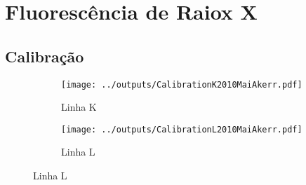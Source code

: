 \section{Fluorescência de Raiox X}

\subsection{Calibração}

\begin{table}[H]
 
  \begin{scriptsize} %
  \caption{}
  
  \end{scriptsize}
\end{table}

\begin{table}[H]
  
  \begin{scriptsize} %
  \caption{}
  
  \end{scriptsize}
\end{table}


\begin{table}[H]
  
  \begin{footnotesize} %
  \caption{}
  
  \end{footnotesize}
\end{table}

\begin{table}[H]
  
  \begin{footnotesize} %
  \caption{}
  
  \end{footnotesize}
\end{table}


\begin{figure}[H]
  \caption{Calibração da Fluorescência de Raiox X - Maio de 2010}
  \begin{subfigure}[b]{0.5\textwidth}
    \texttt{[image: ../outputs/CalibrationK2010MaiAkerr.pdf]}
    \caption{Linha K}
  \end{subfigure}%
  \begin{subfigure}[b]{0.5\textwidth}
    \texttt{[image: ../outputs/CalibrationL2010MaiAkerr.pdf]}
    \caption{Linha L}
  \end{subfigure}
\end{figure}

